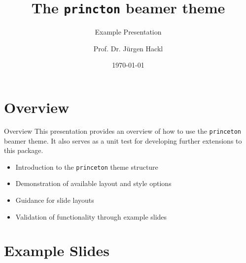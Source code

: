 \documentclass[aspectratio=169]{beamer}
\title{The \texttt{princton} beamer theme}
\subtitle{Example Presentation}
\date{\today}
\author[Hackl]{Prof. Dr. Jürgen Hackl}
\institute[PU]{Princeton University}
\begin{document}
\maketitle

\section{Overview}

\begin{frame}[t]{Overview}
  This presentation provides an overview of how to use the \texttt{princeton} beamer theme. 
  It also serves as a unit test for developing further extensions to this package.
  \begin{itemize}
  \item Introduction to the \texttt{princeton} theme structure
  \item Demonstration of available layout and style options
  \item Guidance for slide layouts
  \item Validation of functionality through example slides
  \end{itemize}
\end{frame}


\section{Example Slides}
\end{document}
